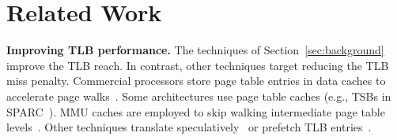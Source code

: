 \section{Related Work}
\label{sec:relatedwork}








\noindent\textbf{Improving TLB performance.} The techniques of Section~\ref{sec:background} improve the TLB reach. In contrast, other techniques target reducing the TLB miss penalty. Commercial processors store page table entries in data caches to accelerate page walks~\cite{intel:architectures}. Some architectures use page table caches (e.g., TSBs in SPARC~\cite{sun:ultrasparc}). MMU caches are employed to skip walking intermediate page table levels~\cite{bhattacharjee:large-reach, barr:translation}. Other techniques translate speculatively~\cite{barr:spectlb} or prefetch TLB entries~\cite{bhattacharjee:characterizing}. 

